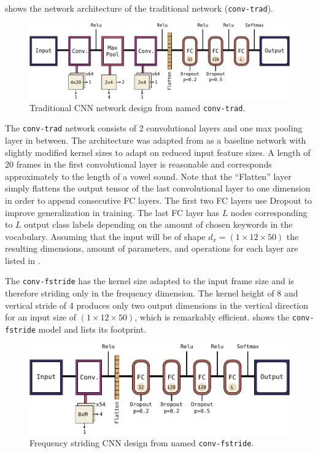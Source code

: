  shows the network architecture of the traditional network (\texttt{conv-trad}).
\begin{figure}[!ht]
  \centering
    \includegraphics[height=0.23\textwidth]{./4_nn/figs/nn_arch_cnn_trad.pdf}
  \caption{Traditional CNN network design from \cite{Sainath2015} named \texttt{conv-trad}.}
  \label{fig:nn_arch_cnn_trad}
\end{figure}
\FloatBarrier
\noindent
The \texttt{conv-trad} network consists of 2 convolutional layers and one max pooling layer in between.
The architecture was adapted from \cite{Sainath2015} as a baseline network with slightly modified kernel sizes to adapt on reduced input feature sizes.
A length of 20 frames in the first convolutional layer is reasonable and corresponds approximately to the length of a vowel sound.
Note that the \enquote{Flatten} layer simply flattens the output tensor of the last convolutional layer to one dimension in order to append consecutive FC layers.
The first two FC layers use Dropout to improve generalization in training.
The last FC layer has $L$ nodes corresponding to $L$ output class labels depending on the amount of chosen keywords in the vocabulary.
Assuming that the input will be of shape $d_x = (1 \times 12 \times 50)$ the resulting dimensions, amount of parameters, and operations for each layer are listed in .


The \texttt{conv-fstride} has the kernel size adapted to the input frame size and is therefore striding only in the frequency dimension.
The kernel height of 8 and vertical stride of 4 produces only two output dimensions in the vertical direction for an input size of $(1 \times 12 \times 50)$, which is remarkably efficient.
 shows the \texttt{conv-fstride} model and  lists its footprint.
\begin{figure}[!ht]
  \centering
    \includegraphics[height=0.23\textwidth]{./4_nn/figs/nn_arch_cnn_fstride.pdf}
  \caption{Frequency striding CNN design from \cite{Sainath2015} named \texttt{conv-fstride}.}
  \label{fig:nn_arch_cnn_fstride}
\end{figure}
\FloatBarrier
\noindent


